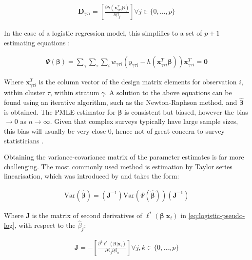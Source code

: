 \begin{align}
\label{eq:logistic-D}
\mathbf{D}_{\gamma \tau i} = \left[ \frac{ \partial h(\mathbf{x}_{\gamma \tau i}^{T} \bm{\beta}) }{ \partial \beta_{j} } \right] \forall j \in \{ 0, ..., p \}
\end{align}

In the case of a logistic regression model, this simplifies to a set of $p + 1$ estimating equations \citep{heeringa2017}:

\begin{align}
\label{eq:logistic-eqns-simple}
\Psi(\bm{\beta}) = \sum_{\gamma} \sum_{\tau} \sum_{i} w_{\gamma \tau i} \left( y_{\gamma \tau i} - h(\mathbf{x}_{\gamma \tau i}^{T} \bm{\beta}) \right) \mathbf{x}_{\gamma \tau i}^{T} = \mathbf{0}
\end{align}

Where $\mathbf{x}_{\gamma \tau i}^{T}$ is the column vector of the design matrix elements for observation $i$, within cluster $\tau$, within stratum $\gamma$. A solution to the above equations can be found using an iterative algorithm, such as the Newton-Raphson method, and $\hat{\bm{\beta}}$ is obtained. The PMLE estimator for $\bm{\beta}$ is consistent but biased, however the bias $\rightarrow 0$ as $n \rightarrow \infty$. Given that complex surveys typically have large sample sizes, this bias will usually be very close 0, hence not of great concern to survey statisticians \citep{heeringa2017}.

Obtaining the variance-covariance matrix of the parameter estimates is far more challenging. The most commonly used method is estimation by Taylor series linearisation, which was introduced by \citet{binder1983} and takes the form:

\begin{align}
\label{eq:variance-estimator}
\text{Var}(\hat{\bm{\beta}})		=		( \mathbf{J}^{-1} ) \text{Var}(\Psi(\hat{\bm{\beta}})) ( \mathbf{J}^{-1} )
\end{align}

Where $\mathbf{J}$ is the matrix of second derivatives of $\ell^{*}(\bm{\beta} | \mathbf{x}_{i})$ in \autoref{eq:logistic-pseudo-log}, with respect to the $\hat{\beta}_{j}$:

\begin{align}
\label{eq:logistic-J}
\mathbf{J} = - \left[ \frac{ \partial^{2} \ell^{*}(\bm{\beta} | \mathbf{x}_{i}) }{ \partial \beta_{j} \partial \beta_{k} } \right] \forall j,k \in \{ 0, ..., p \}
\end{align}

